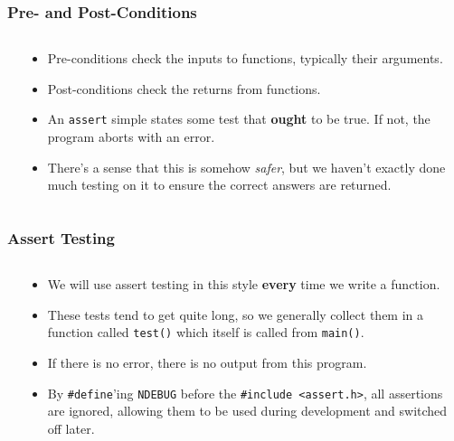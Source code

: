 

\begin{frame}[fragile]
\frametitle{Pre- and Post-Conditions}
\begin{columns}

\begin{column}{0.40\textwidth}

\end{column}

\pause
\begin{column}{0.55\textwidth}
\begin{itemize}[<+->]
\item Pre-conditions check the inputs to functions, typically their arguments.
\item Post-conditions check the returns from functions.
\item An {\tt assert} simple states some test that {\bf ought} to be true. If not, the
program aborts with an error.
\item There's a sense that this is somehow {\it safer}, but we haven't exactly done much testing on it to ensure the correct answers are returned.
\end{itemize}
\end{column}

\end{columns}
\end{frame}



\begin{frame}[fragile]
\frametitle{Assert Testing}
\begin{columns}

\begin{column}{0.40\textwidth}

\end{column}

\pause
\begin{column}{0.55\textwidth}
\begin{itemize}[<+->]
\item We will use assert testing in this style {\bf every} time we write a function.
\item These tests tend to get quite long, so we generally collect them in a function called {\tt test()} which itself is called from {\tt main()}.
\item If there is no error, there is no output from this program.
\item By \verb^#define^'ing \verb^NDEBUG^ before the {\tt \#include <assert.h>}, all assertions are ignored, allowing them to be used during development and switched off later.
\end{itemize}
\end{column}

\end{columns}
\end{frame}

